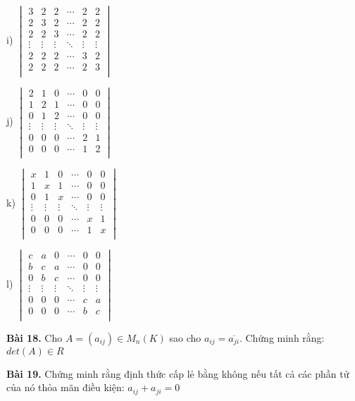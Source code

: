 \documentclass[12pt]{report}
\begin{document}
i) $\begin{vmatrix}
	3 & 2 & 2 & \cdots & 2 & 2 \\
	2 & 3 & 2 & \cdots & 2 & 2 \\
	2 & 2 & 3 & \cdots & 2 & 2 \\
	\vdots & \vdots & \vdots & \ddots & \vdots & \vdots \\
	2 & 2 & 2 & \cdots & 3 & 2 \\
	2 & 2 & 2 & \cdots & 2 & 3 \\
\end{vmatrix}$

j) $\begin{vmatrix}
	2 & 1 & 0 & \cdots & 0 & 0 \\
	1 & 2 & 1 & \cdots & 0 & 0 \\
	0 & 1 & 2 & \cdots & 0 & 0 \\
	\vdots & \vdots & \vdots & \ddots & \vdots & \vdots \\
	0 & 0 & 0 & \cdots & 2 & 1 \\
	0 & 0 & 0 & \cdots & 1 & 2 \\
\end{vmatrix}$

k) $\begin{vmatrix}
	x & 1 & 0 & \cdots & 0 & 0 \\
	1 & x & 1 & \cdots & 0 & 0 \\
	0 & 1 & x & \cdots & 0 & 0 \\
	\vdots & \vdots & \vdots & \ddots & \vdots & \vdots \\
	0 & 0 & 0 & \cdots & x & 1 \\
	0 & 0 & 0 & \cdots & 1 & x \\
\end{vmatrix}$

l) $\begin{vmatrix}
	c & a & 0 & \cdots & 0 & 0 \\
	b & c & a & \cdots & 0 & 0 \\
	0 & b & c & \cdots & 0 & 0 \\
	\vdots & \vdots & \vdots & \ddots & \vdots & \vdots \\
	0 & 0 & 0 & \cdots & c & a \\
	0 & 0 & 0 & \cdots & b & c \\
\end{vmatrix}$

\textbf{Bài 18.} Cho $A = \left( a_{ij}\right) \in M_n(K)$ sao cho $a_{ij} = \overline{a_{ji}}$. Chứng minh rằng: $det(A) \in R$

\textbf{Bài 19.} Chứng minh rằng định thức cấp lẻ bằng không nếu tất cả các phần tử của nó thỏa mãn điều kiện: $a_{ij} + a_{ji} = 0$
\end{document}
